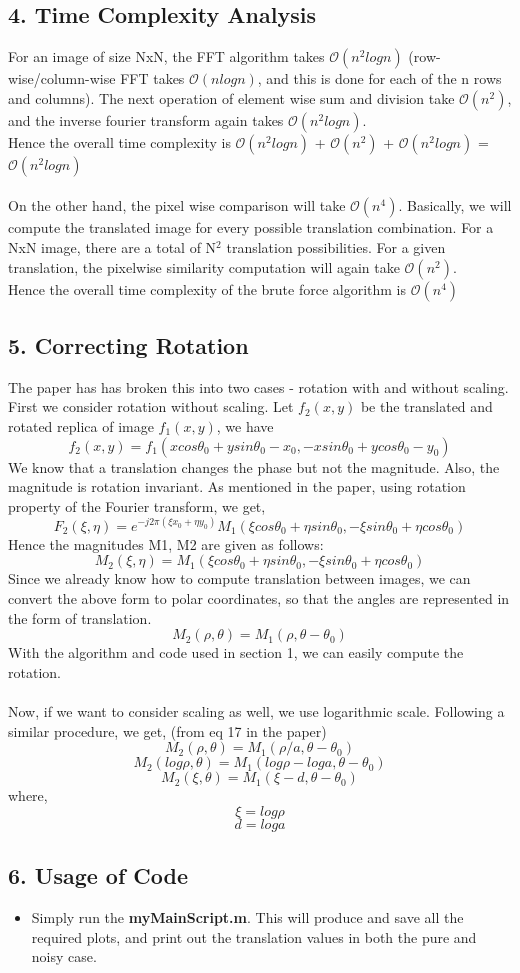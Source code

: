 \documentclass[12pt, a4paper]{article}
\begin{document}
\subsection*{4. Time Complexity Analysis}
For an image of size NxN, the FFT algorithm takes $\mathcal{O}(n^2logn)$ (row-wise/column-wise FFT takes $\mathcal{O}(nlogn)$, and this is done for each of the n rows and columns). The next operation of element wise sum and division take $\mathcal{O}(n^2)$, and the inverse fourier transform again takes $\mathcal{O}(n^2logn)$. \\
Hence the overall time complexity is $\mathcal{O}(n^2logn)$ + $\mathcal{O}(n^2)$ + $\mathcal{O}(n^2logn)$ = $\mathcal{O}(n^2logn)$ \\ \\ 
On the other hand, the pixel wise comparison will take $\mathcal{O}(n^4)$. Basically, we will compute the translated image for every possible translation combination. For a NxN image, there are a total of N$^2$ translation possibilities. For a given translation, the pixelwise similarity computation will again take $\mathcal{O}(n^2)$. \\ Hence the overall time complexity of the brute force algorithm is $\mathcal{O}(n^4)$
\subsection*{5. Correcting Rotation}
The paper has has broken this into two cases - rotation with and without scaling. \\
First we consider rotation without scaling. Let $f_2(x,y)$ be the translated and rotated replica of image $f_1(x,y)$, we have
$$f_2(x,y) = f_1(xcos\theta_0 + ysin\theta_0 - x_0, -xsin\theta_0 + ycos\theta_0 - y_0)$$
We know that a translation changes the phase but not the magnitude. Also, the magnitude is rotation invariant. As mentioned in the paper, using rotation property of the Fourier transform, we get,
$$F_2(\xi ,\eta) = e^{-j2\pi(\xi x_0 + \eta y_0)} M_1(\xi cos\theta_0 + \eta sin\theta_0, -\xi sin\theta_0 + \eta cos\theta_0)$$
Hence the magnitudes M1, M2 are given as follows:
$$M_2(\xi ,\eta) = M_1(\xi cos\theta_0 + \eta sin\theta_0, -\xi sin\theta_0 + \eta cos\theta_0)$$
Since we already know how to compute translation between images, we can convert the above form to polar coordinates, so that the angles are represented in the form of translation.
$$M_2(\rho ,\theta) = M_1(\rho ,\theta-\theta_0)$$
With the algorithm and code used in section 1, we can easily compute the rotation. \\ \\ 
Now, if we want to consider scaling as well, we use logarithmic scale. Following a similar procedure, we get, (from eq 17 in the paper)
$$M_2(\rho ,\theta) = M_1(\rho/a ,\theta-\theta_0)$$
$$M_2(log\rho ,\theta) = M_1(log\rho - loga ,\theta-\theta_0)$$
$$M_2(\xi ,\theta) = M_1(\xi - d ,\theta-\theta_0)$$
where,
$$\xi = log\rho$$
$$d = loga$$
\subsection*{6. Usage of Code}
\begin{itemize}
\item Simply run the \textbf{myMainScript.m}. This will produce and save all the required plots, and print out the translation values in both the pure and noisy case.
\end{itemize}
\end{document}
